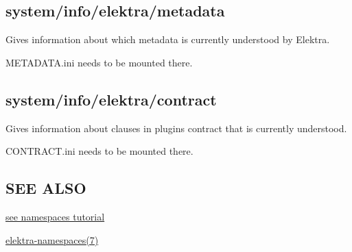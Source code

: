 \subsection*{system/info/elektra/metadata}

Gives information about which metadata is currently understood by Elektra.

{\ttfamily M\+E\+T\+A\+D\+A\+T\+A.\+ini} needs to be mounted there.

\subsection*{system/info/elektra/contract}

Gives information about clauses in plugin\textquotesingle{}s contract that is currently understood.

{\ttfamily C\+O\+N\+T\+R\+A\+C\+T.\+ini} needs to be mounted there.

\subsection*{S\+EE A\+L\+SO}


\begin{DoxyItemize}
\item \hyperlink{doc_tutorials_namespaces_md}{see namespaces tutorial}
\item \hyperlink{md_doc_help_elektra-namespaces_doc_help_elektra-namespaces_md}{elektra-\/namespaces(7)} 
\end{DoxyItemize}